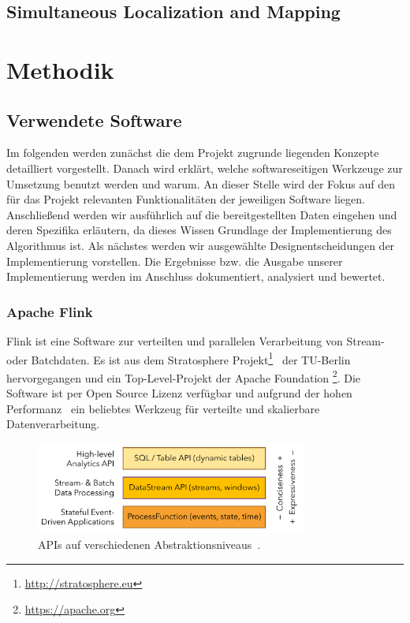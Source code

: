 \documentclass[11pt]{article}
\begin{document}
\subsection{Simultaneous Localization and Mapping}

\section{Methodik}\label{Methodik}
\subsection{Verwendete Software}
Im folgenden werden zunächst die dem Projekt zugrunde liegenden Konzepte detailliert vorgestellt. Danach wird erklärt, welche softwareseitigen Werk\-zeu\-ge zur Umsetzung benutzt werden und warum. An dieser Stelle wird der Fokus auf den für das Projekt relevanten Funktionalitäten der jeweiligen Software liegen. Anschließend werden wir ausführlich auf die bereitgestellten Daten eingehen und deren Spezifika erläutern, da dieses Wissen Grundlage der Implementierung des Algorithmus ist. Als nächstes werden wir ausgewählte Designentscheidungen der Implementierung vorstellen. Die Ergebnisse bzw. die Ausgabe unserer Implementierung werden im Anschluss dokumentiert, analysiert und bewertet.

\subsubsection{Apache Flink}
Flink ist eine Software zur verteilten und parallelen Verarbeitung von Stream- oder Batch\-daten. Es ist aus dem Stratosphere Projekt\footnote{\url{http://stratosphere.eu}}~\cite{alexandrov_stratosphere_2014} der TU-Berlin hervorgegangen und ein Top-Level-Projekt der Apache Foundation \footnote{\url{https://apache.org}}. Die Software ist per Open Source Lizenz verfügbar und aufgrund der hohen Performanz~\cite{alexandrov_stratosphere_2014} ein beliebtes Werkzeug für verteilte und skalierbare Datenverarbeitung.

\begin{figure}[!t]
	\centering
	\includegraphics[width=3.5in]{Flink-api-stack.png}
	\caption{APIs auf verschiedenen Abstraktionsniveaus~\cite{Flink-Grafik-Link}.}
	\label{Flink-APIs}
\end{figure}
\end{document}
